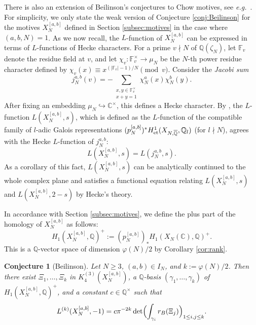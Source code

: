 \documentclass[11pt,a4,leqno]{amsart}
\theoremstyle{my theoremstyle}
\newtheorem{conj}[thm]{Conjecture}
\theoremstyle{dfn}
\theoremstyle{remark}
\renewcommand{\1}{\mathbbm{1}}
\newcommand{\Q}{\mathbb{Q}}
\newcommand{\C}{\mathbb{C}}
\numberwithin{equation}{section}
\begin{document}
There is also an extension of Beilinson's conjectures to Chow motives, see {\it e.g.}~\cite[(6.7)]{Nek94}. For simplicity, we only state the weak version of Conjecture \ref{conj:Beilinson} for the motives $X_N^{[a,b]}$ defined in Section \ref{subsec:motives} in the case where $(a,b,N)=1$. As we now recall, the $L$-function of $X_N^{[a,b]}$ can be expressed in terms of $L$-functions of Hecke characters. For a prime $v \nmid N$ of $\Q(\zeta_N)$, let $\mathbb{F}_v$ denote the residue field at $v$, and let $\chi_v \colon \mathbb{F}_v^{\times} \to \mu_N$ be the $N$-th power residue character defined by $\chi_v(x) \equiv x^{(|\mathbb{F}_v|-1)/N} \pmod{v}$. 
Consider the {\it Jacobi sum} 
$$j_N^{a, b}(v)=-\sum_{\substack{x, y \in \mathbb{F}_v^{\times}\\x+y=1}} \chi_N^a(x) \chi_N^b(y). $$
After fixing an embedding $\mu_N\hookrightarrow \C^\times$, this defines a Hecke character. 
By \cite[Theorem 3.9]{Ots11}, the $L$-function $L(X_N^{[a, b]}, s)$, which is defined as the $L$-function of the compatible family of $l$-adic Galois representations $(p_N^{[a, b]})^*H^1_{\rm et}(X_{N,\overline{\Q}} , \Q_l)$ (for $l \nmid N$), 
agrees with the Hecke $L$-function of $j_N^{a,b}$: 
\begin{equation}\label{eq:HeckeL}
    L(X_N^{[a, b]}, s)=L(j_N^{a, b}, s).
\end{equation} 
As a corollary of this fact, $L(X_N^{[a, b]}, s)$ can be analytically continued to the whole complex plane and satisfies a functional equation relating $L(X_N^{[a, b]},s)$ and $L(X_N^{[a, b]},2-s)$ by Hecke's theory.

In accordance with Section \ref{subsec:motives}, we define the plus part of the homology of $X_N^{[a, b]}$ as follows:
$$H_1(X_N^{[a, b]}, \Q)^+:= (p_N^{[a, b]})_*H_1(X_N(\C), \Q)^+. $$
This is a $\Q$-vector space of dimension $\varphi(N)/2$ by Corollary \ref{cor:rank}. 

\begin{conj}[Beilinson]\label{conj:weakBei}
    Let $N \geq 3$, $(a,b) \in I_N$, and $k := \varphi(N)/2$. Then there exist $\Xi_1, \ldots, \Xi_{k}$ in $K_4^{(3)}(X_N^{[a,b]})$, a $\Q$-basis $(\gamma_1, \ldots, \gamma_{k})$ of $H_1(X_N^{[a,b]}, \Q)^+$, and a constant $c \in \Q^\times$ such that
    \begin{equation*} 
        L^{(k)}(X_N^{[a,b]},-1) = c \pi^{-2k} \det \Bigl(\int_{\gamma_i} r_B(\Xi_j) \Bigr)_{1 \leq i,j \leq k}.
    \end{equation*}
\end{conj}
\end{document}
